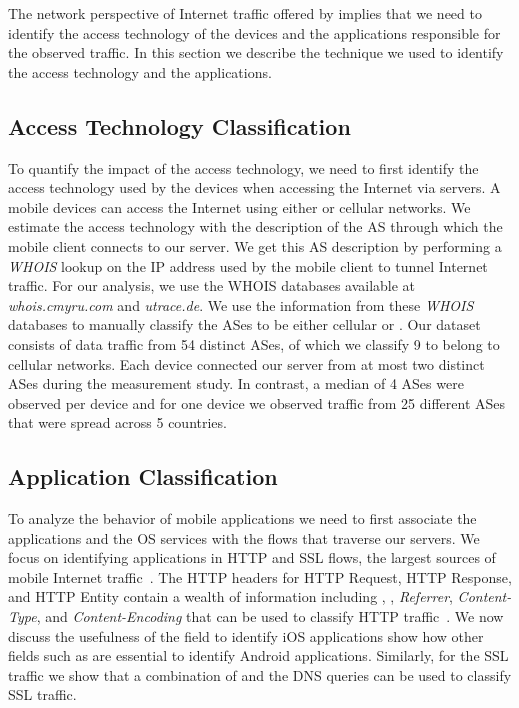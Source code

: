 The network perspective of Internet traffic offered by \platname
implies that we need to identify the access technology of the devices
and the applications responsible for the observed traffic.  In this
section we describe the technique we used to identify the access
technology and the applications.

\subsection{Access Technology Classification}

To quantify the impact of the access technology, we need to first
identify the access technology used by the devices when accessing the
Internet via \platname servers.  A mobile devices can access the
Internet using either \wifi or cellular networks.  We estimate the
access technology with the description of the AS through which the
mobile client connects to our \platname server.  We get this AS
description by performing a \emph{WHOIS} lookup on the IP address used
by the mobile client to tunnel Internet traffic.  For our analysis, we
use the WHOIS databases available at \emph{whois.cmyru.com} and
\emph{utrace.de}.  We use the information from these \emph{WHOIS}
databases to manually classify the ASes to be either cellular or
\wifi.  Our dataset consists of data traffic from 54 distinct ASes, of
which we classify 9 to belong to cellular networks.  Each device
connected our \platname server from at most two distinct ASes during
the measurement study.  In contrast, a median of 4 \wifi ASes were
observed per device and for one device we observed traffic from 25
different \wifi ASes that were spread across 5 countries.

\subsection{Application Classification}

To analyze the behavior of mobile applications we need to first
associate the applications and the OS services with the flows that
traverse our \platname servers.  We focus on identifying applications
in HTTP and SSL flows, the largest sources of mobile Internet
traffic~\cite{maier:mobtraffic,falaki:mobileusage,xu:appusage}.  The
HTTP headers for HTTP Request, HTTP Response, and HTTP Entity contain
a wealth of information including \useragent, \httphost,
\emph{Referrer}, \emph{Content-Type}, and \emph{Content-Encoding} that
can be used to classify HTTP traffic~\cite{rfc:http}.  We now discuss
the usefulness of the \useragent field to identify iOS applications
show how other fields such as \httphost are essential to identify
Android applications.  Similarly, for the SSL traffic we show that a
combination of \sslservername and the DNS queries can be used to
classify SSL traffic.


